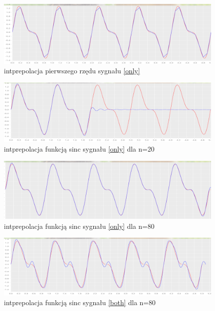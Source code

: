 \documentclass[12pt]{article}
\begin{document}
\begin{figure}[H]
	\includegraphics[width=\linewidth]{2z1.png}
	\caption{intprepolacja pierwszego rzędu sygnału \ref{only}}
\end{figure}

\begin{figure}[H]
	\includegraphics[width=\linewidth]{2zs20.png}
	\caption{intprepolacja funkcją sinc sygnału \ref{only} dla n=20}
\end{figure}

\begin{figure}[H]
	\includegraphics[width=\linewidth]{2zs80.png}
	\caption{intprepolacja funkcją sinc sygnału \ref{only} dla n=80}
\end{figure}

\begin{figure}[H]
	\includegraphics[width=\linewidth]{2zs80both.png}
	\caption{intprepolacja funkcją sinc sygnału \ref{both} dla n=80}
\end{figure}
\cite{instrukcja}
\renewcommand\refname{Bibliografia}


\end{document}
